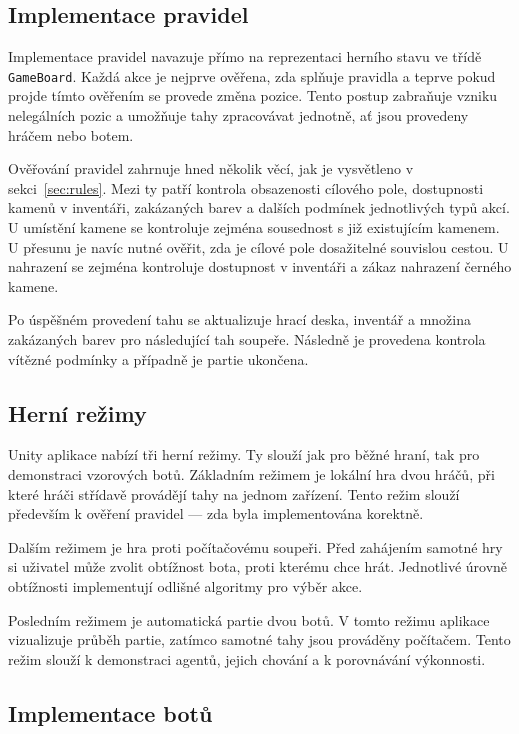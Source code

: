 \subsection{Implementace pravidel}

Implementace pravidel navazuje přímo na reprezentaci herního stavu ve třídě \texttt{GameBoard}. Každá akce je nejprve ověřena, zda splňuje pravidla a teprve
pokud projde tímto ověřením se provede změna pozice. Tento postup zabraňuje vzniku nelegálních pozic a umožňuje tahy zpracovávat jednotně,
ať jsou provedeny hráčem nebo botem.

Ověřování pravidel zahrnuje hned několik věcí, jak je vysvětleno v sekci~\ref{sec:rules}. Mezi ty patří kontrola obsazenosti cílového pole, 
dostupnosti kamenů v inventáři, zakázaných barev a dalších podmínek jednotlivých typů akcí. U umístění kamene se kontroluje zejména sousednost 
s již existujícím kamenem. U přesunu je navíc nutné ověřit, zda je cílové pole dosažitelné souvislou cestou. U nahrazení se zejména kontroluje dostupnost
v inventáři a zákaz nahrazení černého kamene.

Po úspěšném provedení tahu se aktualizuje hrací deska, inventář a množina zakázaných barev pro následující tah soupeře. Následně je provedena 
kontrola vítězné podmínky a případně je partie ukončena.

\subsection{Herní režimy}

Unity aplikace nabízí tři herní režimy. Ty slouží jak pro běžné hraní, tak pro demonstraci vzorových botů. Základním režimem je lokální hra 
dvou hráčů, při které hráči střídavě provádějí tahy na jednom zařízení. Tento režim slouží především k ověření pravidel --- zda byla implementována
korektně.

Dalším režimem je hra proti počítačovému soupeři. Před zahájením samotné hry si uživatel může zvolit obtížnost bota, proti kterému chce hrát. Jednotlivé
úrovně obtížnosti implementují odlišné algoritmy pro výběr akce.

Posledním režimem je automatická partie dvou botů. V tomto režimu aplikace vizualizuje průběh partie, zatímco samotné tahy jsou prováděny počítačem.
Tento režim slouží k demonstraci agentů, jejich chování a k porovnávání výkonnosti.

\subsection{Implementace botů}

